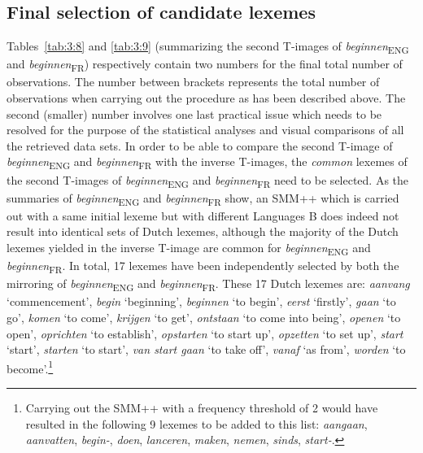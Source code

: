 \subsection{Final selection of candidate lexemes}\label{sec:3.6.4}  
Tables~\ref{tab:3:8} and \ref{tab:3:9} (summarizing the second T-images of \textit{beginnen}\textsubscript{ENG} and \textit{beginnen}\textsubscript{FR}) respectively contain two numbers for the final total number of observations. The number between brackets represents the total number of observations when carrying out the procedure as has been described above. The second (smaller) number involves one last practical issue which needs to be resolved for the purpose of the statistical analyses and visual comparisons of all the retrieved data sets. In order to be able to compare the second T-image of \textit{beginnen}\textsubscript{ENG} and \textit{beginnen}\textsubscript{FR} with the inverse T-images, the \textit{common} lexemes of the second T-images of \textit{beginnen}\textsubscript{ENG} and \textit{beginnen}\textsubscript{FR} need to be selected. As the summaries of \textit{beginnen}\textsubscript{ENG} and \textit{beginnen}\textsubscript{FR} show, an SMM++ which is carried out with a same initial lexeme but with different Languages B does indeed not result into identical sets of Dutch lexemes, although the majority of the Dutch lexemes yielded in the inverse T-image are common for \textit{beginnen}\textsubscript{ENG} and \textit{beginnen}\textsubscript{FR}. In total, 17 lexemes have been independently selected by both the mirroring of \textit{beginnen}\textsubscript{ENG} and \textit{beginnen}\textsubscript{FR}. These 17 Dutch lexemes are: \textit{aanvang} `commencement', \textit{begin} `beginning', \textit{beginnen} `to begin', \textit{eerst} `firstly', \textit{gaan} `to go', \textit{komen} `to come', \textit{krijgen} `to get', \textit{ontstaan} `to come into being', \textit{openen} `to open', \textit{oprichten} `to establish', \textit{opstarten} `to start up', \textit{opzetten} `to set up', \textit{start} `start', \textit{starten} `to start', \textit{van start gaan} `to take off', \textit{vanaf} `as from', \textit{worden} `to become'.\footnote{Carrying out the SMM++ with a frequency threshold of 2 would have resulted in the following 9 lexemes to be added to this list: \textit{aangaan}, \textit{aanvatten}, \textit{begin-}, \textit{doen}, \textit{lanceren}, \textit{maken}, \textit{nemen}, \textit{sinds}, \textit{start-}.}

